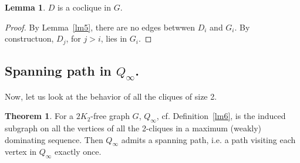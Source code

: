 \documentclass{amsart}
\theoremstyle{definition}
\newtheorem{theorem}{Theorem}
\newtheorem{lemma}{Lemma}
\begin{document}
\begin{lemma}\label{lmDcoclique}
$D$ is a coclique in $G$.
\end{lemma}
\begin{proof}
By Lemma~\ref{lm5}, there are no edges betwwen $D_i$ and $G_i$. By constructuon, 
$D_j$, for $j>i$, lies in $G_i$.
\end{proof}

\subsection{Spanning path in $Q_{\infty}$.}
Now, let us look at the behavior of all the cliques of size 2.
\begin{theorem}\label{thm4}
For a $2K_2$-free graph $G$, $Q_{\infty}$, cf. Definition~\ref{lm6}, is the induced subgraph on all the vertices of all the 2-cliques in a maximum (weakly) dominating sequence. 
Then $Q_{\infty}$ admits a spanning path, i.e. a path visiting each vertex in $Q_{\infty}$ exactly once.
\end{theorem}
\end{document}
